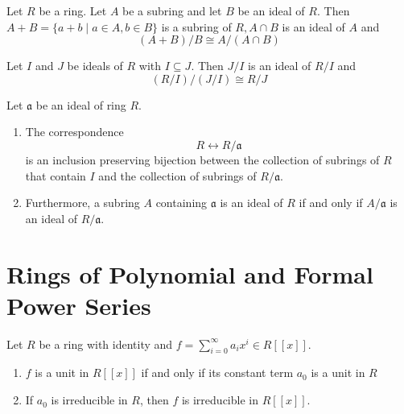 \begin{theorem}
    Let $R$ be a ring. Let $A$ be a subring and let $B$ be an ideal of $R$. Then $A+B=\{a+b \mid a \in A, b \in B\}$ is a subring of $R, A \cap B$ is an ideal of $A$ and \begin{equation*}
        (A+B) / B \cong A /(A \cap B)
    \end{equation*}
\end{theorem}


\begin{theorem}
    Let $I$ and $J$ be ideals of $R$ with $I \subseteq J$. Then $J / I$ is an ideal of $R / I$ and
    \begin{equation*}
        (R / I) /(J / I) \cong R / J
    \end{equation*}
\end{theorem}

\begin{theorem}
    Let $\mathfrak{a}$ be an ideal of ring $R$.
    \begin{enumerate}
        \item
              The correspondence
              \begin{equation}
                  R \leftrightarrow R / \mathfrak{a}
              \end{equation}
              is an inclusion preserving bijection between the collection of subrings of $R$ that contain $I$ and the collection of subrings of $R / \mathfrak{a}$.

        \item
              Furthermore, a subring $A$ containing $\mathfrak{a}$ is an  ideal of $R$ if and only if $A / \mathfrak{a}$ is an ideal of $R / \mathfrak{a}$.
    \end{enumerate}
\end{theorem}



\section{Rings of Polynomial and Formal Power Series}


\begin{proposition}
    Let $R$ be a ring with identity and $f=\sum_{i=0}^{\infty} a_{i} x^{i} \in R[[x]]$.
    \begin{enumerate}
        \item
              $f$ is a unit in $R[[x]]$ if and only if its constant term $a_0$ is a unit in $R$
        \item
              If $a_0$ is irreducible in $R$, then $f$ is irreducible in $R[[x]]$.
    \end{enumerate}
\end{proposition}


